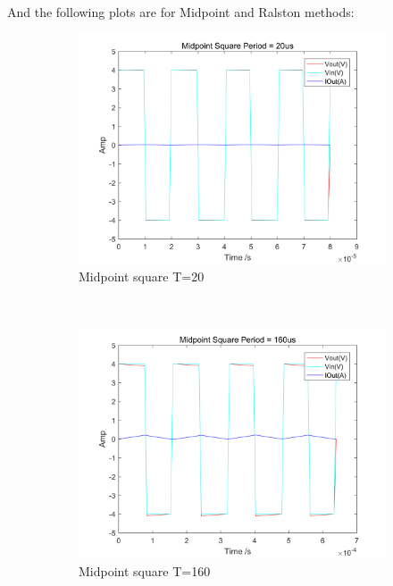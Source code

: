 \documentclass[a4paper, 12pt]{article}
\begin{document}
\newpage
And the following plots are for Midpoint and Ralston methods:
\begin{figure}[h]
      \centering
      \begin{subfigure}[b]{0.4\textwidth}
            \includegraphics[width=\textwidth]{ex1/midpoint_square_20.png}
            \caption{Midpoint square T=20}
      \end{subfigure}
      ~
      \begin{subfigure}[b]{0.4\textwidth}
            \includegraphics[width=\textwidth]{ex1/midpoint_square_160.png}
            \caption{Midpoint square T=160}
      \end{subfigure}
       ~
      \begin{subfigure}[b]{0.4\textwidth}

\end{subfigure}
\end{figure}
\end{document}
